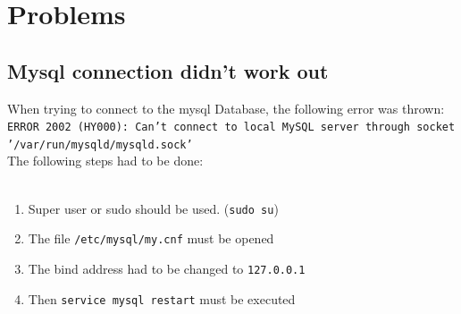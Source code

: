 \documentclass[10pt]{article}
\begin{document}

\newpage
\section{Problems}
\subsection{Mysql connection didn't work out}
When trying to connect to the mysql Database, the following error was thrown:
\texttt{ERROR 2002 (HY000): Can't connect to local MySQL server through socket '/var/run/mysqld/mysqld.sock'} \\
The following steps had to be done: \\
\\ 
\begin{enumerate}
\item Super user or sudo should be used. (\texttt{sudo su}) 
\item The file \texttt{/etc/mysql/my.cnf} must be opened 
\item The bind address had to be changed to \texttt{127.0.0.1}
\item Then \texttt{service mysql restart} must be executed
\end{enumerate}
\cite{mysqlProblem1}
\end{document}
